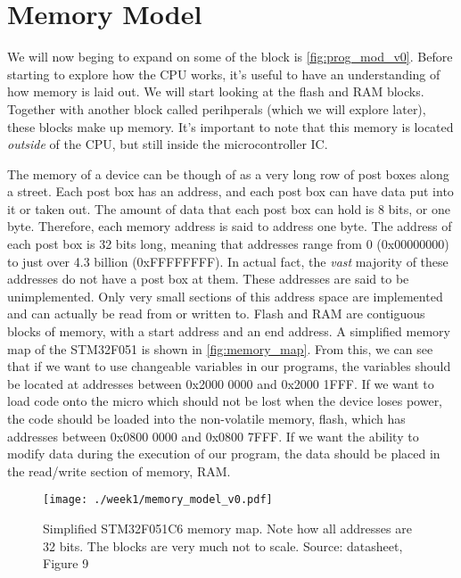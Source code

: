 \chapter{Memory Model}
We will now beging to expand on some of the block is \autoref{fig:prog_mod_v0}. Before starting to explore how the CPU works, it's useful to have an understanding of how memory is laid out. We will start looking at the flash and RAM blocks. Together with another block called perihperals (which we will explore later), these blocks make up memory. 
It's important to note that this memory is located \emph{outside} of the CPU, but still inside the microcontroller IC.

The memory of a device can be though of as a very long row of post boxes along a street. 
Each post box has an address, and each post box can have data put into it or taken out. The amount of data that each post box can hold is 8 bits, or one byte. Therefore, each memory address is said to address one byte. 
The address of each post box is 32 bits long, meaning that addresses range from 0 (0x00000000) to just over 4.3 billion (0xFFFFFFFF). In actual fact, the \emph{vast} majority of these addresses do not have a post box at them. These addresses are said to be unimplemented. 
Only very small sections of this address space are implemented and can actually be read from or written to.
Flash and RAM are contiguous blocks of memory, with a start address and an end address. A simplified memory map of the STM32F051 is shown in \autoref{fig:memory_map}. From this, we can see that if we want to use changeable variables in our programs, the variables should be located at addresses between 0x2000 0000 and 0x2000 1FFF. If we want to load code onto the micro which should not be lost when the device loses power, the code should be loaded into the non-volatile memory, flash, which has addresses between 0x0800 0000 and 0x0800 7FFF.
If we want the ability to modify data during the execution of our program, the data should be placed in the read/write section of memory, RAM. 

\begin{figure}
  \centering
  \texttt{[image: ./week1/memory\_model\_v0.pdf]}
  \caption{Simplified STM32F051C6 memory map. Note how all addresses are 32 bits. The blocks are very much not to scale. Source: datasheet, Figure 9}
  \label{fig:memory_map}
\end{figure}

